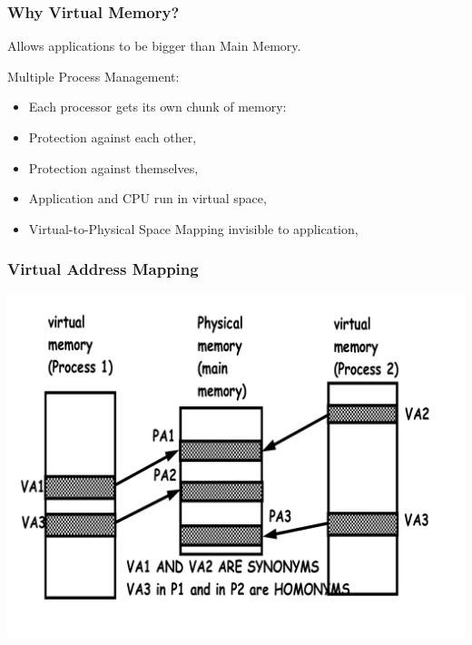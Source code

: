 \documentclass{beamer}
\begin{document}
\begin{frame}[fragile,t]
\frametitle{Why Virtual Memory?}

Allows applications to be bigger than Main Memory.\smallskip

Multiple Process Management:\smallskip
\begin{itemize}
    \item Each processor gets its own chunk of memory:
    \item Protection against each other,
    \item Protection against themselves,
    \item Application and CPU run in virtual space,
    \item Virtual-to-Physical Space Mapping invisible to application,
\end  {itemize}

\end{frame}

\begin{frame}[fragile,t]
\frametitle{Virtual Address Mapping}
\includegraphics[width=55ex]{FigsMemH/PageSynHom}

\end{frame}
\end{document}
